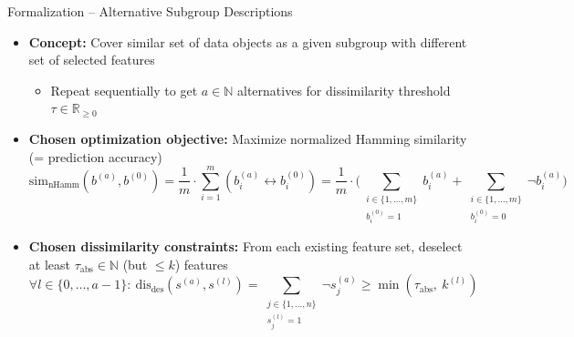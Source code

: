 \documentclass[en, navbaroff, handout]{sdqbeamer}
\begin{document}
\begin{frame}[t]{Formalization -- Alternative Subgroup Descriptions}
	\begin{itemize}
		\item \textbf{Concept:} Cover similar set of data objects as a given subgroup with different set of selected features
		\begin{itemize}
			\item Repeat sequentially to get $a \in \mathbb{N}$ alternatives for dissimilarity threshold~$\tau \in \mathbb{R}_{\geq 0}$
		\end{itemize}
		\pause
		\vspace{\baselineskip}
		\item \textbf{Chosen optimization objective:} Maximize normalized Hamming similarity (= prediction accuracy)
		\begin{equation*}
			\text{sim}_{\text{nHamm}}(b^{(a)}, b^{(0)}) = \frac{1}{m} \cdot \sum_{i=1}^m \left( b_i^{(a)} \leftrightarrow b_i^{(0)} \right) = \frac{1}{m} \cdot \Big( \sum\limits_{\substack{i \in \{1, \dots, m\} \\ b_i^{(0)} = 1}} b_i^{(a)} + \sum\limits_{\substack{i \in \{1, \dots, m\} \\ b_i^{(0)} = 0}} \lnot b_i^{(a)} \Big)
		\end{equation*}
		\pause
		\vspace{\baselineskip}
		\item \textbf{Chosen dissimilarity constraints:} From each existing feature set, deselect at least $\tau_{\text{abs}} \in \mathbb{N}$ (but $\leq k$) features
		\begin{equation*}
			\forall l \in \{0, \dots, a-1\}:~ \text{dis}_{\text{des}}(s^{(a)}, s^{(l)}) = \sum_{\substack{j \in \{1, \dots, n\} \\ s^{(l)}_j = 1}} \lnot s^{(a)}_j \geq \min \left( \tau_{\text{abs}},~k^{(l)} \right)
		\end{equation*}
	\end{itemize}
\end{frame}
\end{document}
